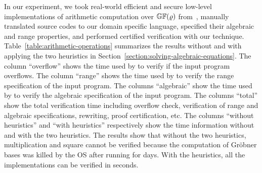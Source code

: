 
In our experiment, we took real-world efficient and secure
low-level implementations of arithmetic computation over
$\mathbb{GF}(\varrho)$ from~\cite{BDL+:11:HSHSS,BDL+:12:HSHSS},
manually translated source
codes to our domain specific language, specified their algebraic and range
properties, and performed certified verification with our technique.
Table~\ref{table:arithmetic-operations} summarizes the results
without and with applying the two heuristics in Section~\ref{section:solving-algebraic-equations}.
The column ``overflow'' shows the time used by \boolector to verify if the input program overflows.
The column ``range'' shows the time used by \boolector to verify the range specification of the input program.
The columns ``algebraic'' show the time used by \singular to verify the algebraic specification of the input program.
The columns ``total'' show the total verification time including overflow check, verification of range and algebraic specifications, rewriting, proof certification, etc.
The columns ``without heuristics'' and ``with heuristics'' respectively show the time information without and with the two heuristics.
The results show that without the two heuristics, multiplication and square
cannot be verified because the computation of Gr\"obner bases was killed by the OS
after running for days.
With the heuristics, all the implementations can be verified in seconds.



